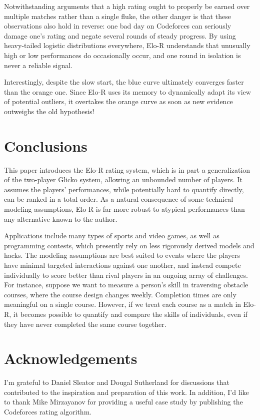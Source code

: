 \documentclass{article}
\begin{document}
Notwithstanding arguments that a high rating ought to properly be earned over multiple matches rather than a single fluke, the other danger is that these observations also hold in reverse: one bad day on Codeforces can seriously damage one's rating and negate several rounds of steady progress. By using heavy-tailed logistic distributions everywhere, Elo-R understands that unusually high or low performances do occasionally occur, and one round in isolation is never a reliable signal.

Interestingly, despite the slow start, the blue curve ultimately converges faster than the orange one. Since Elo-R uses its memory to dynamically adapt its view of potential outliers, it overtakes the orange curve as soon as new evidence outweighs the old hypothesis!

\section{Conclusions}

This paper introduces the Elo-R rating system, which is in part a generalization of the two-player Glicko system, allowing an unbounded number of players. It assumes the players' performances, while potentially hard to quantify directly, can be ranked in a total order. As a natural consequence of some technical modeling assumptions, Elo-R is far more robust to atypical performances than any alternative known to the author.

Applications include many types of sports and video games, as well as programming contests, which presently rely on less rigorously derived models and hacks. The modeling assumptions are best suited to events where the players have minimal targeted interactions against one another, and instead compete individually to score better than rival players in an ongoing array of challenges. For instance, suppose we want to measure a person's skill in traversing obstacle courses, where the course design changes weekly. Completion times are only meaningful on a single course. However, if we treat each course as a match in Elo-R, it becomes possible to quantify and compare the skills of individuals, even if they have never completed the same course together.

\section*{Acknowledgements}

I'm grateful to Daniel Sleator and Dougal Sutherland for discussions that contributed to the inspiration and preparation of this work. In addition, I'd like to thank Mike Mirzayanov for providing a useful case study by publishing the Codeforces rating algorithm.



\end{document}
